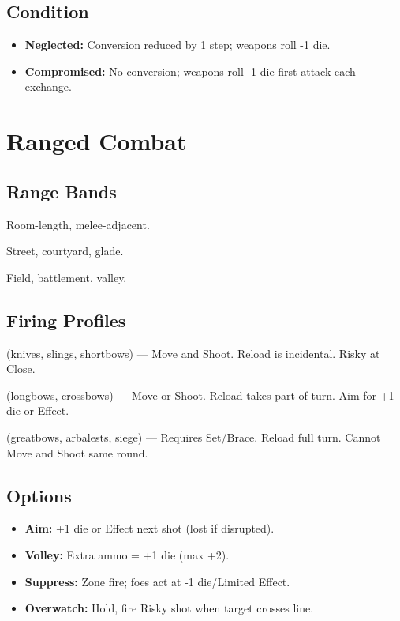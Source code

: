 \subsection*{Condition}
\begin{itemize}
  \item \textbf{Neglected:} Conversion reduced by 1 step; weapons roll -1 die.
  \item \textbf{Compromised:} No conversion; weapons roll -1 die first attack each exchange.
\end{itemize}

\section{Ranged Combat}
\label{sec:ranged}

\subsection*{Range Bands}
\begin{description}[leftmargin=1.5em]
  \item[Close:] Room-length, melee-adjacent.
  \item[Near:] Street, courtyard, glade.
  \item[Far:] Field, battlement, valley.
\end{description}

\subsection*{Firing Profiles}
\begin{description}[leftmargin=1.5em]
  \item[Fast:] (knives, slings, shortbows) — Move and Shoot. Reload is incidental. Risky at Close.
  \item[Standard:] (longbows, crossbows) — Move or Shoot. Reload takes part of turn. Aim for +1 die or Effect.
  \item[Slow:] (greatbows, arbalests, siege) — Requires Set/Brace. Reload full turn. Cannot Move and Shoot same round.
\end{description}

\subsection*{Options}
\begin{itemize}
  \item \textbf{Aim:} +1 die or Effect next shot (lost if disrupted).
  \item \textbf{Volley:} Extra ammo = +1 die (max +2).
  \item \textbf{Suppress:} Zone fire; foes act at -1 die/Limited Effect.
  \item \textbf{Overwatch:} Hold, fire Risky shot when target crosses line.
\end{itemize}

